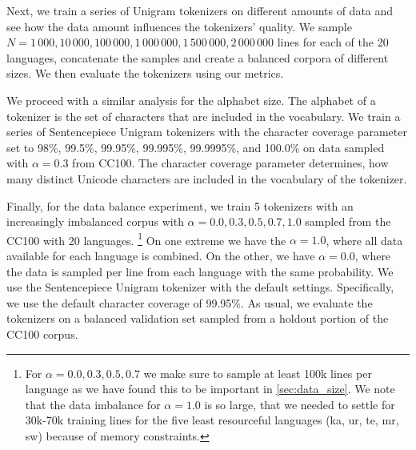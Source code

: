 Next, we train a series of Unigram tokenizers on different amounts of data and see how the data amount influences the tokenizers' quality. We sample $N = 1\,000, 10\,000, 100\,000, 1\,000\,000, 1\,500\,000, 2\,000\,000$ lines for each of the 20 languages, concatenate the samples and create a balanced corpora of different sizes. We then evaluate the tokenizers using our metrics.

We proceed with a similar analysis for the alphabet size. The alphabet of a tokenizer is the set of characters that are included in the vocabulary.
 We train a series of Sentencepiece Unigram tokenizers with the character coverage parameter  set to 98\%, 99.5\%, 99.95\%, 99.995\%, 99.9995\%, and 100.0\% on data sampled with $\alpha=0.3$ from CC100. The character coverage parameter determines, how many distinct Unicode characters are included in the vocabulary of the tokenizer.

Finally, for the data balance experiment, we train 5 tokenizers with an increasingly imbalanced corpus with $\alpha = 0.0, 0.3, 0.5, 0.7, 1.0$ sampled from the CC100 with 20 languages. \footnote{For $\alpha = 0.0, 0.3, 0.5, 0.7$ we make sure to sample at least 100k lines per language as we have found this to be important in \autoref{sec:data_size}. We note that the data imbalance for $\alpha=1.0$ is so large, that we needed to settle for 30k-70k training lines for the five least resourceful languages (ka, ur, te, mr, sw) because of memory constraints.} On one extreme we have the $\alpha=1.0$, where all data available for each language is combined. On the other, we have $\alpha=0.0$, where the data is sampled per line from each language with the same probability. We use the Sentencepiece Unigram tokenizer with the default settings. Specifically, we use the default character coverage of 99.95\%. As usual, we evaluate the tokenizers on a balanced validation set sampled from a holdout portion of the CC100 corpus. 


